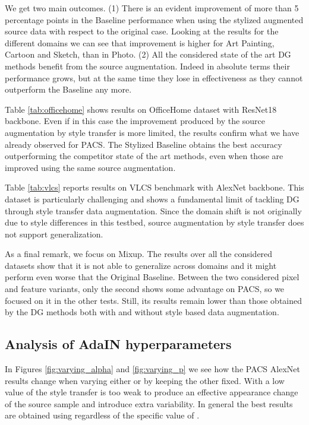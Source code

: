 We get two main outcomes. (1) There is an evident improvement of more than 5 percentage points in the Baseline performance when using the stylized augmented source data with respect to the original case.
Looking at the results for the different domains we can see that improvement is higher for Art Painting, Cartoon and Sketch, than in Photo. 
(2) All the considered state of the art DG methods benefit from the source augmentation. Indeed in absolute terms their performance grows, but at the same time they lose in effectiveness as they cannot outperform the Baseline any more.


Table \ref{tab:officehome} shows results on OfficeHome dataset with ResNet18 backbone. Even if in this case the improvement produced by the source augmentation by style transfer is more limited, the results confirm what we have already observed for PACS. The Stylized Baseline obtains the best accuracy outperforming the competitor state of the art methods, even when those are improved using the same source augmentation.

Table \ref{tab:vlcs} reports results on VLCS benchmark with AlexNet backbone. This dataset is particularly challenging and shows a fundamental limit of tackling DG through style transfer data augmentation. Since the domain shift is not originally due to style differences in this testbed, source augmentation by style transfer does not support generalization.

As a final remark, we focus on Mixup. The results over all the considered datasets show that it is not able to generalize across domains and it might perform even worse that the Original Baseline. Between the two considered pixel and feature variants, only the second shows some advantage on PACS, so we focused on it in the other tests. Still, its results remain lower than those obtained by the DG methods both with and without style based data augmentation. 

\subsection{Analysis of AdaIN hyperparameters}
\label{sec:sensitivity}
In Figures \ref{fig:varying_alpha} and \ref{fig:varying_p} we see how the PACS AlexNet results change when varying either  or  by keeping the other fixed. With a low value of  the style transfer is too weak to produce an effective appearance change of the source sample and introduce extra variability. In general the best results are obtained using  regardless of the specific value of . 

